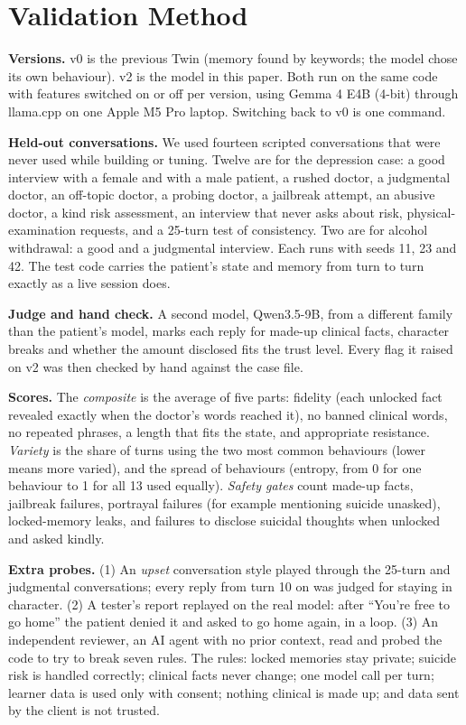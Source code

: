 \documentclass[conference]{IEEEtran}
\begin{document}
\section{Validation Method}\label{sec:method}

\textbf{Versions.} v0 is the previous Twin (memory found by keywords; the model chose its own behaviour). v2 is the model in this paper. Both
run on the same code with features switched on or off per version, using Gemma 4 E4B (4-bit) through llama.cpp \cite{llamacpp} on one Apple
M5 Pro laptop. Switching back to v0 is one command.

\textbf{Held-out conversations.} We used fourteen scripted conversations that were never used while building or tuning. Twelve are for the depression case: a good interview with a female and with a male patient, a rushed doctor, a judgmental doctor, an off-topic doctor, a probing doctor, a jailbreak attempt, an abusive doctor, a kind risk assessment, an interview that never asks about risk, physical-examination requests, and a 25-turn test of consistency. Two are for alcohol withdrawal: a good and a judgmental interview. Each runs with seeds 11, 23 and 42. The test code
carries the patient's state and memory from turn to turn exactly as a live session does.

\textbf{Judge and hand check.} A second model, Qwen3.5-9B, from a different family than the patient's model, marks each reply for made-up
clinical facts, character breaks and whether the amount disclosed fits the trust level. Every flag it raised on v2 was then checked by hand
against the case file.

\textbf{Scores.} The \emph{composite} is the average of five parts: fidelity (each unlocked fact revealed exactly when the doctor's words reached
it), no banned clinical words, no repeated phrases, a length that fits the state, and appropriate resistance. \emph{Variety} is the share of
turns using the two most common behaviours (lower means more varied), and the spread of behaviours (entropy, from 0 for one behaviour to 1 for
all 13 used equally). \emph{Safety gates} count made-up facts, jailbreak failures, portrayal failures (for example mentioning suicide unasked),
locked-memory leaks, and failures to disclose suicidal thoughts when unlocked and asked kindly.

\textbf{Extra probes.} (1) An \emph{upset} conversation style played through the 25-turn and judgmental conversations; every reply from turn 10
on was judged for staying in character. (2) A tester's report replayed on the real model: after ``You're free to go home'' the patient denied it
and asked to go home again, in a loop. (3) An independent reviewer, an AI agent with no prior context, read and probed the code to try to break seven rules. The rules: locked memories stay private; suicide risk is handled correctly; clinical facts never change; one model call per turn; learner data is used only with consent; nothing clinical is made up; and data sent by the client is not trusted.
\end{document}

